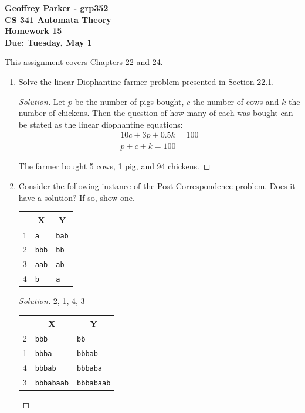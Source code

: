 \documentclass[10pt]{article}
\begin{document}
\begin{flushleft}
\textbf{\noindent
Geoffrey Parker - grp352\\
CS 341 Automata Theory \\
Homework 15 \\
Due: Tuesday, May 1}\\
\end{flushleft}

\noindent
This assignment covers Chapters 22 and 24.\\

\begin{enumerate}[1)]


\item
Solve the linear Diophantine farmer problem presented in Section 22.1.
\begin{proof}[Solution]
Let $p$ be the number of pigs bought, $c$ the number of cows and $k$ the number of chickens.  Then the question of how many of each was bought can be stated as the linear diophantine equations:
\begin{align*}
10c + 3p + 0.5k = 100\\
p + c + k = 100
\end{align*}

The farmer bought 5 cows, 1 pig, and 94 chickens.
\end{proof}


\item
Consider the following instance of the Post Correspondence problem.  Does it have a solution?  If so, show one.\\
\begin{center}
\begin{tabular}{| p{1cm} | p{3cm} | p{3cm} |}
  \hline
  \multicolumn{1}{|c}{}&
  \multicolumn{1}{|c|}{X}&
  \multicolumn{1}{c|}{Y}\\
  \hline
  1&\texttt{a}&\texttt{bab}\\
  \hline
  2&\texttt{bbb}&\texttt{bb}\\
  \hline
  3&\texttt{aab}&\texttt{ab}\\
  \hline
  4&\texttt{b}&\texttt{a}\\
  \hline
\end{tabular}
\end{center}
\begin{proof}[Solution]
2, 1, 4, 3\\
\begin{center}
\begin{tabular}{l l | l}
  &
  \multicolumn{1}{c|}{X}&
  \multicolumn{1}{c}{Y}\\
  \hline
  2&\texttt{bbb}&\texttt{bb}\\
  1&\texttt{bbba}&\texttt{bbbab}\\
  4&\texttt{bbbab}&\texttt{bbbaba}\\
  3&\texttt{bbbabaab}&\texttt{bbbabaab}\\
\end{tabular}
\end{center}
\end{proof}


\end{enumerate}
\end{document}
